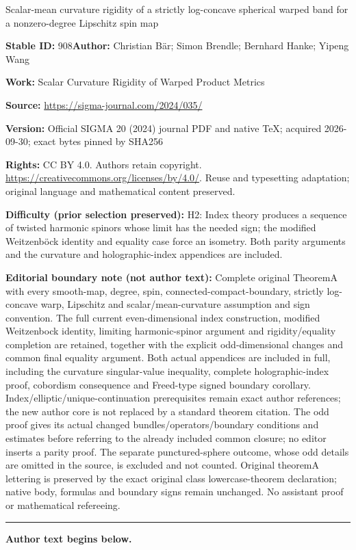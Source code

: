 \documentclass[11pt]{article}
\numberwithin{equation}{section}
\numberwithin{equation}{section}
\begin{document}
\begin{center}\Large Scalar-mean curvature rigidity of a strictly log-concave spherical warped band for a nonzero-degree Lipschitz spin map\end{center}
\noindent\textbf{Stable ID:} 908\quad\textbf{Author:} Christian Bär; Simon Brendle; Bernhard Hanke; Yipeng Wang\par
\noindent\textbf{Work:} Scalar Curvature Rigidity of Warped Product Metrics\par
\noindent\textbf{Source:} \url{https://sigma-journal.com/2024/035/}\par
\noindent\textbf{Version:} Official SIGMA 20 (2024) journal PDF and native TeX; acquired 2026-09-30; exact bytes pinned by SHA256\par
\noindent\textbf{Rights:} CC BY 4.0. Authors retain copyright. \url{https://creativecommons.org/licenses/by/4.0/}. Reuse and typesetting adaptation; original language and mathematical content preserved.\par
\noindent\textbf{Difficulty (prior selection preserved):} {\CJKfont H2: Index theory produces a sequence of twisted harmonic spinors whose limit has the needed sign; the modified Weitzenböck identity and equality case force an isometry. Both parity arguments and the curvature and holographic-index appendices are included.}\par
\medskip\noindent\textbf{Editorial boundary note (not author text):} Complete original TheoremA with every smooth-map, degree, spin, connected-compact-boundary, strictly log-concave warp, Lipschitz and scalar/mean-curvature assumption and sign convention. The full current even-dimensional index construction, modified Weitzenbock identity, limiting harmonic-spinor argument and rigidity/equality completion are retained, together with the explicit odd-dimensional changes and common final equality argument. Both actual appendices are included in full, including the curvature singular-value inequality, complete holographic-index proof, cobordism consequence and Freed-type signed boundary corollary. Index/elliptic/unique-continuation prerequisites remain exact author references; the new author core is not replaced by a standard theorem citation. The odd proof gives its actual changed bundles/operators/boundary conditions and estimates before referring to the already included common closure; no editor inserts a parity proof. The separate punctured-sphere outcome, whose odd details are omitted in the source, is excluded and not counted. Original theoremA lettering is preserved by the exact original class lowercase-theorem declaration; native body, formulas and boundary signs remain unchanged. No assistant proof or mathematical refereeing.\par
\medskip\hrule\medskip\noindent\textbf{Author text begins below.}\par
\end{document}
